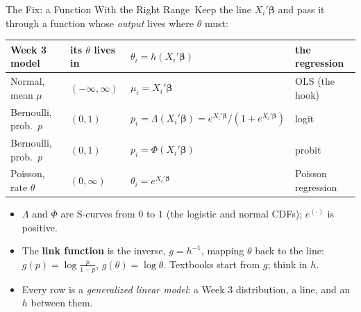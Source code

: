 \documentclass[aspectratio=169,11pt,xcolor=dvipsnames]{beamer}
\newcommand{\core}{\,\raisebox{0.6pt}{\textcolor{corestar}{$\bigstar$}}}
\begin{document}
\begin{frame}{The Fix: a Function With the Right Range\core}
Keep the line $X_i'\bm\beta$ and pass it through a function whose
\emph{output} lives where $\theta$ must:
\begin{center}\small
\renewcommand{\arraystretch}{1.0}
\begin{tabular}{llll}
\toprule
Week 3 model & its $\theta$ lives in & $\theta_i = h(X_i'\bm\beta)$ & the regression \\
\midrule
Normal, mean $\mu$ & $(-\infty, \infty)$ & $\mu_i = X_i'\bm\beta$ & OLS (the hook) \\
Bernoulli, prob.\ $p$ & $(0, 1)$ & $p_i = \Lambda(X_i'\bm\beta) = e^{X_i'\bm\beta}/(1+e^{X_i'\bm\beta})$ & logit \\
Bernoulli, prob.\ $p$ & $(0, 1)$ & $p_i = \Phi(X_i'\bm\beta)$ & probit \\
Poisson, rate $\theta$ & $(0, \infty)$ & $\theta_i = e^{X_i'\bm\beta}$ & Poisson regression \\
\bottomrule
\end{tabular}
\end{center}
\vskip2pt
\begin{itemize}\itemsep2pt
  \item $\Lambda$ and $\Phi$ are S-curves from $0$ to $1$ (the logistic
        and normal CDFs); $e^{(\cdot)}$ is positive.
  \item The \textbf{link function} is the inverse, $g = h^{-1}$, mapping
        $\theta$ back to the line: $g(p) = \log\frac{p}{1-p}$,
        $g(\theta) = \log\theta$. Textbooks start from $g$; think in $h$.
  \item Every row is a \emph{generalized linear model}: a Week 3
        distribution, a line, and an $h$ between them.
\end{itemize}
\end{frame}
\end{document}
